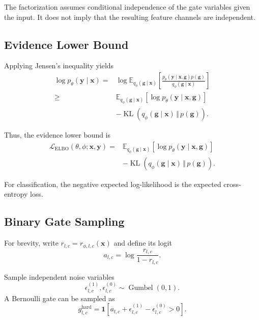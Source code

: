 \documentclass[sigplan,screen]{acmart}
\begin{document}
The factorization assumes conditional independence of the
gate variables given the input. It does not imply that the
resulting feature channels are independent.

\subsection{Evidence Lower Bound}

Applying Jensen's inequality yields
\begin{equation}
\begin{split}
\log p_\theta(\mathbf{y}\mid\mathbf{x})
={}&
\log
\mathbb{E}_{q_\phi(\mathbf{g}\mid\mathbf{x})}
\left[
\frac{
p_\theta(\mathbf{y}\mid\mathbf{x},\mathbf{g})
p(\mathbf{g})
}{
q_\phi(\mathbf{g}\mid\mathbf{x})
}
\right]
\\
\geq{}&
\mathbb{E}_{q_\phi(\mathbf{g}\mid\mathbf{x})}
\left[
\log p_\theta(\mathbf{y}\mid\mathbf{x},\mathbf{g})
\right]
\\
&-
\operatorname{KL}
\left(
q_\phi(\mathbf{g}\mid\mathbf{x})
\,\Vert\,p(\mathbf{g})
\right).
\end{split}
\end{equation}

Thus, the evidence lower bound is
\begin{equation}
\begin{split}
\mathcal{L}_{\mathrm{ELBO}}
(\theta,\phi;\mathbf{x},\mathbf{y})
={}&
\mathbb{E}_{q_\phi(\mathbf{g}\mid\mathbf{x})}
\left[
\log p_\theta(\mathbf{y}\mid\mathbf{x},\mathbf{g})
\right]
\\
&-
\operatorname{KL}
\left(
q_\phi(\mathbf{g}\mid\mathbf{x})
\,\Vert\,p(\mathbf{g})
\right).
\end{split}
\end{equation}

For classification, the negative expected log-likelihood
is the expected cross-entropy loss.

\subsection{Binary Gate Sampling}

For brevity, write
$r_{l,c}=r_{\phi,l,c}(\mathbf{x})$ and define its logit
\begin{equation}
a_{l,c}
=
\log\frac{r_{l,c}}{1-r_{l,c}}.
\end{equation}

Sample independent noise variables
\begin{equation}
\epsilon^{(1)}_{l,c},
\epsilon^{(0)}_{l,c}
\sim\operatorname{Gumbel}(0,1).
\end{equation}
A Bernoulli gate can be sampled as
\begin{equation}
g^{\mathrm{hard}}_{l,c}
=
\mathbf{1}
\left[
a_{l,c}
+
\epsilon^{(1)}_{l,c}
-
\epsilon^{(0)}_{l,c}
>0
\right].
\end{equation}
\end{document}
